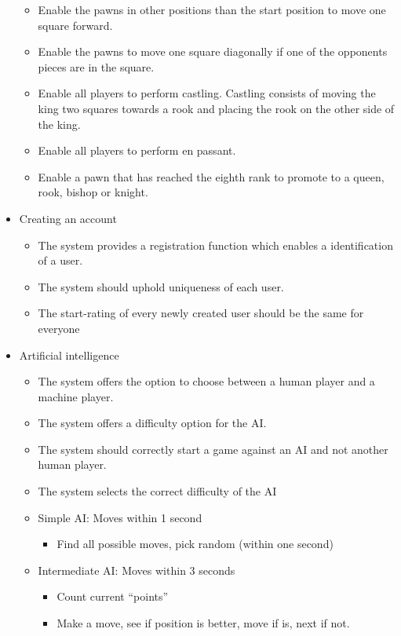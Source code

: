\documentclass{article}
\begin{document}
\begin{flushleft}
\begin{itemize}
\begin{itemize}
		\item Enable the pawns in other positions than the start position to move one square forward.
		\item Enable the pawns to move one square diagonally if one of the opponents pieces are in the square.
		\item Enable all players to perform castling. Castling consists of moving the king two squares towards a rook and placing the rook on the other side of the king. 
		\item Enable all players to perform en passant.
		\item Enable a pawn that has reached the eighth rank to promote to a queen, rook, bishop or knight. 
	\end{itemize}
	\newpage
	\item Creating an account
	\begin{itemize}
		\item The system provides a registration function which enables a identification of a user.
		\item The system should uphold uniqueness of each user.
		\item The start-rating of every newly created user should be the same for everyone 
	\end{itemize}
	\item Artificial intelligence
	\begin{itemize}
	    \item The system offers the option to choose between a human player and a machine player.
		\item The system offers a difficulty option for the AI.
		\item The system should correctly start a game against an AI and not another human player.
		\item The system selects the correct difficulty of the AI
		\item Simple AI: Moves within 1 second
		\begin{itemize}
			\item Find all possible moves, pick random (within one second)
		\end{itemize}
		\item Intermediate AI: Moves within 3 seconds
		\begin{itemize}
			\item Count current “points”
			\item Make a move, see if position is better, move if is, next if not.
		\end{itemize}

\end{itemize}
\end{itemize}
\end{flushleft}
\end{document}
